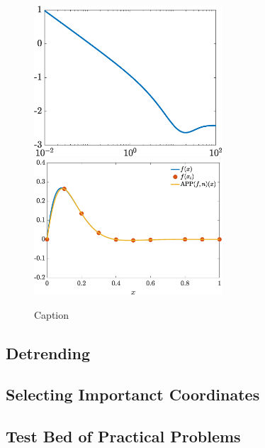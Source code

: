 \documentclass[11pt]{NSFamsart}
\begin{document}
\begin{figure}
    \centering
    \includegraphics[width = 7cm]{ProgramsImages/fandDataAndOptAppx.eps} \qquad \qquad
    \includegraphics[width = 7cm]{ProgramsImages/fandDataAndOptyAppx.eps}
    \caption{Caption}
    \label{fig:my_label}
\end{figure}




\subsection{Detrending} \label{sec:detrending}

\subsection{Selecting Importanct Coordinates} \label{sec:seletCoord}

\subsection{Test Bed of Practical Problems} \label{sec:TestBed}
\end{document}
